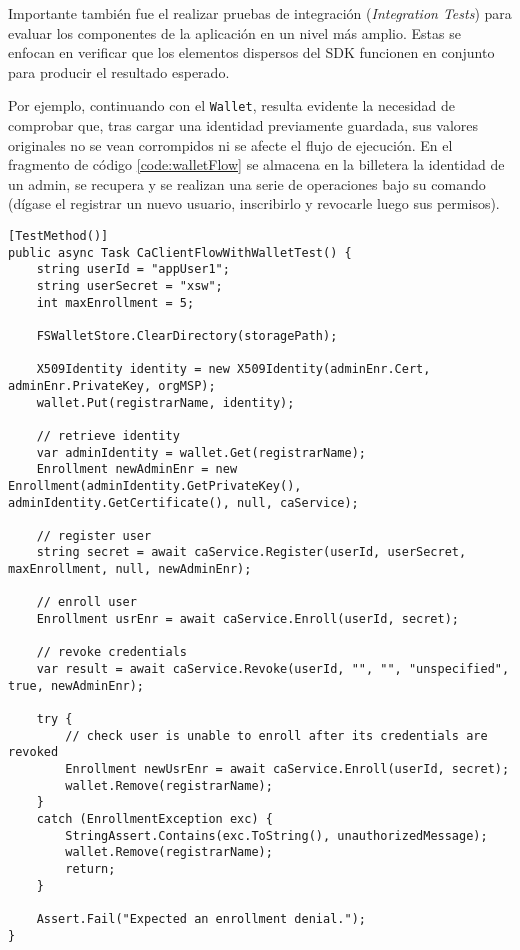 
Importante tambi\'en fue el realizar pruebas de integraci\'on (\emph{Integration Tests}) para evaluar los componentes de la aplicación en un nivel más amplio. Estas se enfocan en verificar que los elementos dispersos del SDK funcionen en conjunto para producir el resultado esperado.

Por ejemplo, continuando con el \texttt{Wallet}, resulta evidente la necesidad de comprobar que, tras cargar una identidad previamente guardada, sus valores originales no se vean corrompidos ni se afecte el flujo de ejecuci\'on. En el fragmento de c\'odigo \ref{code:walletFlow} se almacena en la billetera la identidad de un admin, se recupera y se realizan una serie de operaciones bajo su comando (d\'igase el registrar un nuevo usuario, inscribirlo y revocarle luego sus permisos).

\begin{lstlisting}[caption={Test para verificar el comporamiento de un flujo completo utilizando identidades de una billetera.}, label={code:walletFlow}]
[TestMethod()]
public async Task CaClientFlowWithWalletTest() {
	string userId = "appUser1";
	string userSecret = "xsw";
	int maxEnrollment = 5;

	FSWalletStore.ClearDirectory(storagePath);

	X509Identity identity = new X509Identity(adminEnr.Cert, adminEnr.PrivateKey, orgMSP);
	wallet.Put(registrarName, identity);

	// retrieve identity
	var adminIdentity = wallet.Get(registrarName);
	Enrollment newAdminEnr = new Enrollment(adminIdentity.GetPrivateKey(), adminIdentity.GetCertificate(), null, caService);

	// register user
	string secret = await caService.Register(userId, userSecret, maxEnrollment, null, newAdminEnr);

	// enroll user
	Enrollment usrEnr = await caService.Enroll(userId, secret);

	// revoke credentials
	var result = await caService.Revoke(userId, "", "", "unspecified", true, newAdminEnr);

	try {
		// check user is unable to enroll after its credentials are revoked
		Enrollment newUsrEnr = await caService.Enroll(userId, secret);
		wallet.Remove(registrarName);
	}
	catch (EnrollmentException exc) {
		StringAssert.Contains(exc.ToString(), unauthorizedMessage);
		wallet.Remove(registrarName);
		return;
	}

	Assert.Fail("Expected an enrollment denial.");
}
\end{lstlisting}

